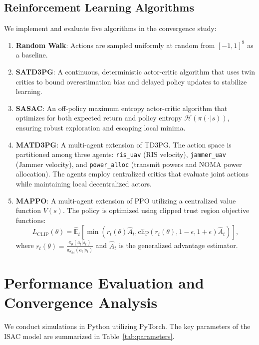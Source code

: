 \documentclass[journal,onecolumn]{IEEEtran}
\begin{document}
\subsection{Reinforcement Learning Algorithms}
We implement and evaluate five algorithms in the convergence study:
\begin{enumerate}
    \item \textbf{Random Walk}: Actions are sampled uniformly at random from $[-1, 1]^9$ as a baseline.
    \item \textbf{SATD3PG}: A continuous, deterministic actor-critic algorithm that uses twin critics to bound overestimation bias and delayed policy updates to stabilize learning.
    \item \textbf{SASAC}: An off-policy maximum entropy actor-critic algorithm that optimizes for both expected return and policy entropy $\mathcal{H}(\pi(\cdot|s))$, ensuring robust exploration and escaping local minima.
    \item \textbf{MATD3PG}: A multi-agent extension of TD3PG. The action space is partitioned among three agents: \texttt{ris\_uav} (RIS velocity), \texttt{jammer\_uav} (Jammer velocity), and \texttt{power\_alloc} (transmit powers and NOMA power allocation). The agents employ centralized critics that evaluate joint actions while maintaining local decentralized actors.
    \item \textbf{MAPPO}: A multi-agent extension of PPO utilizing a centralized value function $V(s)$. The policy is optimized using clipped trust region objective functions:
    \begin{equation}
        L_{\text{CLIP}}(\theta) = \hat{\mathbb{E}}_t \left[ \min\left( r_t(\theta)\hat{A}_t, \text{clip}(r_t(\theta), 1-\epsilon, 1+\epsilon)\hat{A}_t \right) \right],
    \end{equation}
    where $r_t(\theta) = \frac{\pi_\theta(a_t|s_t)}{\pi_{\theta_{\text{old}}}(a_t|s_t)}$ and $\hat{A}_t$ is the generalized advantage estimator.
\end{enumerate}

\section{Performance Evaluation and Convergence Analysis}
\label{sec:convergence}
We conduct simulations in Python utilizing PyTorch. The key parameters of the ISAC model are summarized in Table~\ref{tab:parameters}.
\end{document}
